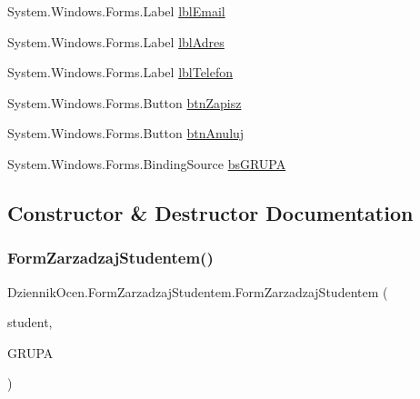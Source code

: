 \begin{DoxyCompactItemize}
\item 
System.\+Windows.\+Forms.\+Label \hyperlink{class_dziennik_ocen_1_1_form_zarzadzaj_studentem_a44a5cb8264b5afe2cf830b996fc6c005}{lbl\+Email}
\item 
System.\+Windows.\+Forms.\+Label \hyperlink{class_dziennik_ocen_1_1_form_zarzadzaj_studentem_a0d41096de98b53d58817064c21408cec}{lbl\+Adres}
\item 
System.\+Windows.\+Forms.\+Label \hyperlink{class_dziennik_ocen_1_1_form_zarzadzaj_studentem_a8d890775b92e88eddf4e726e7fd715d1}{lbl\+Telefon}
\item 
System.\+Windows.\+Forms.\+Button \hyperlink{class_dziennik_ocen_1_1_form_zarzadzaj_studentem_aaa007386b53a7c157e97fbfcd6375697}{btn\+Zapisz}
\item 
System.\+Windows.\+Forms.\+Button \hyperlink{class_dziennik_ocen_1_1_form_zarzadzaj_studentem_aaf2b7d143a88c7eca727c9d07fe173e5}{btn\+Anuluj}
\item 
System.\+Windows.\+Forms.\+Binding\+Source \hyperlink{class_dziennik_ocen_1_1_form_zarzadzaj_studentem_a69189dd9447d5adfea2153e6cf1c1276}{bs\+G\+R\+U\+PA}
\end{DoxyCompactItemize}


\subsection{Constructor \& Destructor Documentation}
\mbox{\label{class_dziennik_ocen_1_1_form_zarzadzaj_studentem_a2437cda216a51a08ae749edb555e8b28}} 
\subsubsection{\texorpdfstring{Form\+Zarzadzaj\+Studentem()}{FormZarzadzajStudentem()}}
{\footnotesize\ttfamily Dziennik\+Ocen.\+Form\+Zarzadzaj\+Studentem.\+Form\+Zarzadzaj\+Studentem (\begin{DoxyParamCaption}\item[{\hyperlink{class_dziennik_ocen_1_1_s_t_u_d_e_n_t}{S\+T\+U\+D\+E\+NT}}]{student,  }\item[{I\+List$<$ \hyperlink{class_dziennik_ocen_1_1_g_r_u_p_a}{G\+R\+U\+PA} $>$}]{G\+R\+U\+PA }\end{DoxyParamCaption})\hspace{0.3cm}{\ttfamily [inline]}}



